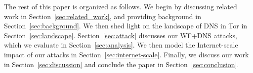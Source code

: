 The rest of this paper is organized as follows.  We begin by discussing related
work in Section~\ref{sec:related_work}, and providing background in
Section~\ref{sec:background}.  We then shed light on the landscape of DNS in Tor
in Section~\ref{sec:landscape}.  Section~\ref{sec:attack} discusses our WF+DNS
attacks, which we evaluate in Section~\ref{sec:analysis}.  We
then model the Internet-scale impact of our attacks in
Section~\ref{sec:internet-scale}.  Finally, we discuss our work in
Section~\ref{sec:discussion} and conclude the paper in
Section~\ref{sec:conclusion}.
